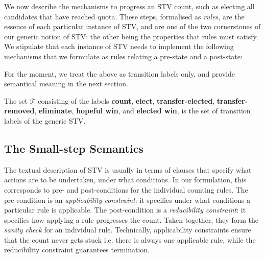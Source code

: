 \documentclass{llncs}
\begin{document}
We now describe the mechanisms to progress an STV count, such as
electing all candidates that have reached quota. 
These steps, formalised as \emph{rules},  are the essence of each 
particular instance of 
STV, and are one of the two cornerstones of our generic notion of STV: the
other being the properties that rules must satisfy. We stipulate
that each instance of STV needs to implement the following
mechanisms that we formulate as rules relating a pre-state and a
post-state:

\smallskip\noindent{}

\smallskip\noindent
For the moment, we treat the above as transition labels only, and
provide semantical meaning in the next section.

\begin{definition}\label{stv:trans}
The set $\mathcal{T}$ consisting of the labels \textbf{count}, \textbf{elect}, \textbf{transfer-elected}, \textbf{transfer-removed}, \textbf{eliminate}, \textbf{hopeful win}, and \textbf{elected win}, is the set of transition labels of the generic STV.
\end{definition}

\subsection{The Small-step Semantics}
The textual description of STV is usually in terms of clauses that
specify what actions are to be undertaken, under what conditions. In
our formulation, this corresponds to pre- and post-conditions for the
individual counting rules. The pre-condition is an
\emph{applicability constraint}: it specifies under what conditions
a particular rule is applicable. The post-condition is a
\emph{reducibility constraint}: it specifies how applying a rule
progresses the count.  Taken together, they form the \emph{sanity
check} for an individual rule. Technically, applicability
constraints ensure that the count never gets stuck i.e. there is
always one applicable rule, while the reducibility constraint guarantees termination. 
\end{document}
